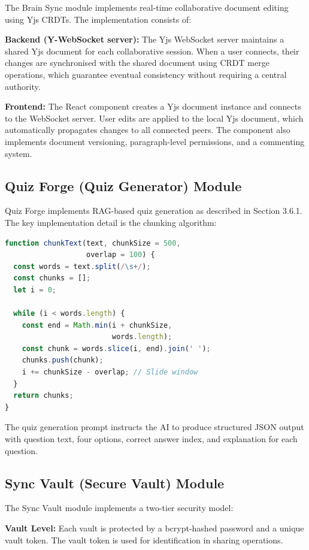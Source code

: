 \documentclass[12pt,a4paper]{report}
\begin{document}
The Brain Sync module implements real-time collaborative document editing using Yjs CRDTs. The implementation consists of:

\textbf{Backend (Y-WebSocket server):} The Yjs WebSocket server maintains a shared Yjs document for each collaborative session. When a user connects, their changes are synchronised with the shared document using CRDT merge operations, which guarantee eventual consistency without requiring a central authority.

\textbf{Frontend:} The React component creates a Yjs document instance and connects to the WebSocket server. User edits are applied to the local Yjs document, which automatically propagates changes to all connected peers. The component also implements document versioning, paragraph-level permissions, and a commenting system.

\subsection{Quiz Forge (Quiz Generator) Module}

Quiz Forge implements RAG-based quiz generation as described in Section 3.6.1. The key implementation detail is the chunking algorithm:

\begin{lstlisting}[language=JavaScript, caption={Text Chunking Algorithm}]
function chunkText(text, chunkSize = 500,
                   overlap = 100) {
  const words = text.split(/\s+/);
  const chunks = [];
  let i = 0;

  while (i < words.length) {
    const end = Math.min(i + chunkSize,
                         words.length);
    const chunk = words.slice(i, end).join(' ');
    chunks.push(chunk);
    i += chunkSize - overlap; // Slide window
  }
  return chunks;
}
\end{lstlisting}

The quiz generation prompt instructs the AI to produce structured JSON output with question text, four options, correct answer index, and explanation for each question.

\subsection{Sync Vault (Secure Vault) Module}

The Sync Vault module implements a two-tier security model:

\textbf{Vault Level:} Each vault is protected by a bcrypt-hashed password and a unique vault token. The vault token is used for identification in sharing operations.
\end{document}
